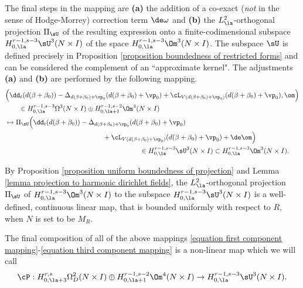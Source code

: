 \documentclass[hidelinks, 12pt, oneside, reqno]{amsart}
\begin{document}
The final steps in the mapping are \textbf{(a)} the addition of a co-exact (\textit{not} in the sense of Hodge-Morrey) correction term $\de \omega$ and \textbf{(b)} the $L^2_{\la}$-orthogonal projection $\Pi_{\sU}$ of the resulting expression onto a finite-codimensional subspace $H_{0,\la}^{r-1,s-3}\sU^3(N \times I)$ of the space $H_{0,\la}^{r-1,s-3}\Om^3(N \times I)$. The subspace $\sU$ is defined precisely in Proposition \ref{proposition boundedness of restricted forms} and can be considered the complement of an ``approximate kernel". The adjustments \textbf{(a)} and \textbf{(b)} are performed by the following mapping.
\begin{align}
    &\Big( \dd_t (d(\beta + \beta_0)) - \Delta_{d(\beta + \beta_0) + \vp_0} (d(\beta + \beta_0) + \vp_0) + \cL_{V(d(\beta + \beta_0) + \vp_0)} (d(\beta + \beta_0) + \vp_0), \om\Big) \nonumber \\
    & \qquad \in H_{0,\la}^{r-1,s-3}\Omega^3(N \times I) \oplus H_{0,\la + 1}^{r-1,s-2}\Om^4 (N \times I)  \nonumber \\
    &\mapsto \Pi_{\sU} \Big(\dd_t (d(\beta + \beta_0)) - \Delta_{d(\beta + \beta_0) + \vp_0} (d(\beta + \beta_0) + \vp_0) \label{equation third component mapping} \\ 
    &\hspace{5cm} + \cL_{V(d(\beta + \beta_0) + \vp_0)} (d(\beta + \beta_0) + \vp_0) + \de \om \Big) \nonumber \\
    & \hspace{6.9cm} \in H_{0,\la}^{r-1,s-3}\sU^3(N \times I) \subset H_{0,\la}^{r-1,s-3}\Om^3(N \times I). \nonumber 
\end{align}

\begin{rmk}\label{remark uniform boundedness of projection to U}
By Proposition \ref{proposition uniform boundedness of projection} and Lemma \ref{lemma projection to harmonic dirichlet fields}, the $L^2_{\la}$-orthogonal projection $\Pi_{\sU}$ of $H^{r-1,s-3}_{0,\la}\Om^3(N \times I)$ to the subspace $H^{r-1,s-3}_{0,\la}\sU^3(N \times I)$ is a well-defined, continuous linear map, that is bounded uniformly with respect to $R$, when $N$ is set to be $M_R$. 
\end{rmk}

The final composition of all of the above mappings \eqref{equation first component mapping}-\eqref{equation third component mapping} is a non-linear map which we will call
\begin{equation}\label{equation fix notation mapping}
\cP : H^{r,s}_{0,\la+3} \Omega^2_D(N \times I) \oplus H_{0,\la+1}^{r-1,s-2}\Om^4 (N \times I)  \rightarrow H_{0,\la}^{r-1,s-3}\sU^3(N \times I).
\end{equation}
\end{document}
